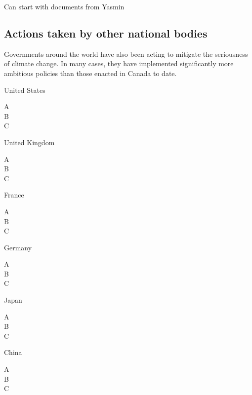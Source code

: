 \textsf{Can start with documents from Yasmin}


		
		\subsection{Actions taken by other national bodies}
		
Governments around the world have also been acting to mitigate the seriousness of climate change. In many cases, they have implemented significantly more ambitious policies than those enacted in Canada to date.

United States
\begin{description}
	\item[A]
	\item[B]
	\item[C]
\end{description}



United Kingdom
\begin{description}
	\item[A]
	\item[B]
	\item[C]
\end{description}



France
\begin{description}
	\item[A]
	\item[B]
	\item[C]
\end{description}



Germany
\begin{description}
	\item[A]
	\item[B]
	\item[C]
\end{description}



Japan
\begin{description}
	\item[A]
	\item[B]
	\item[C]
\end{description}




China
\begin{description}
	\item[A]
	\item[B]
	\item[C]
\end{description}



